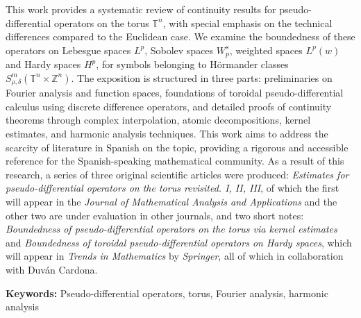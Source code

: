 \vspace{0.3in}
		This work provides a systematic review of continuity results for pseudo-differential operators on the torus $\mathbb{T}^n$, with special emphasis on the technical differences compared to the Euclidean case. We examine the boundedness of these operators on Lebesgue spaces $L^p$, Sobolev spaces $W^s_p$, weighted spaces $L^p(w)$ and Hardy spaces $H^p$, for symbols belonging to Hörmander classes $S^m_{\rho,\delta}(\mathbb{T}^n \times \mathbb{Z}^n)$. The exposition is structured in three parts: preliminaries on Fourier analysis and function spaces, foundations of toroidal pseudo-differential calculus using discrete difference operators, and detailed proofs of continuity theorems through complex interpolation, atomic decompositions, kernel estimates, and harmonic analysis techniques. This work aims to address the scarcity of literature in Spanish on the topic, providing a rigorous and accessible reference for the Spanish-speaking mathematical community. As a result of this research, a series of three original scientific articles were produced: \textit{Estimates for pseudo-differential operators on the torus revisited. I, II, III}, of which the first will appear in the \textit{Journal of Mathematical Analysis and Applications} and the other two are under evaluation in other journals, and two short notes: \textit{Boundedness of pseudo-differential operators on the torus via kernel estimates} and \textit{Boundedness of toroidal pseudo-differential operators on Hardy spaces}, which will appear in \textit{Trends in Mathematics} by \textit{Springer}, all of which in collaboration with Duván Cardona.
		
		\textbf{Keywords:} Pseudo-differential operators, torus, Fourier analysis, harmonic analysis


